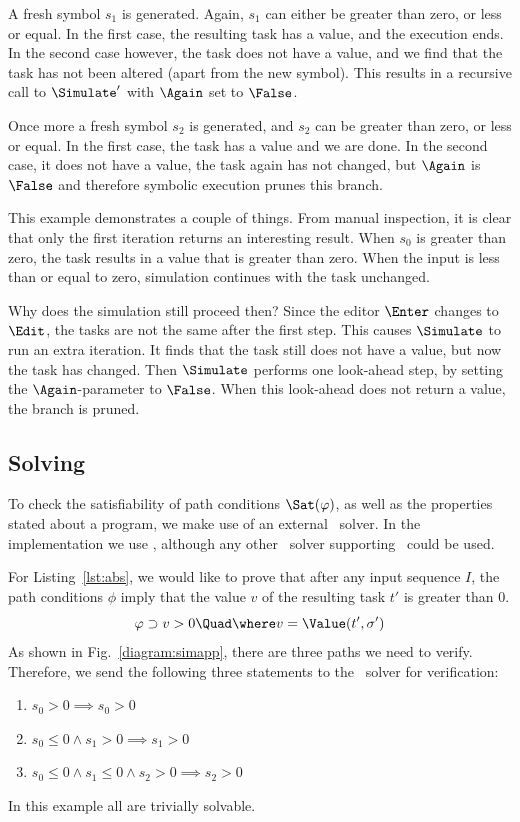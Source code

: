 A fresh symbol $s_1$ is generated.
Again, $s_1$ can either be greater than zero, or less or equal.
In the first case, the resulting task has a value, and the execution ends.
In the second case however, the task does not have a value, and we find that the task has not been altered (apart from the new symbol).
This results in a recursive call to $\Simulate'$ with $\Again$ set to $\False$.

Once more a fresh symbol $s_2$ is generated, and $s_2$ can be greater than zero, or less or equal.
In the first case, the task has a value and we are done.
In the second case, it does not have a value, the task again has not changed, but $\Again$ is $\False$ and therefore symbolic execution prunes this branch.

This example demonstrates a couple of things.
From manual inspection, it is clear that only the first iteration returns an interesting result.
When $s_0$ is greater than zero, the task results in a value that is greater than zero.
When the input is less than or equal to zero, simulation continues with the task unchanged.

Why does the simulation still proceed then?
Since the editor $\Enter$ changes to $\Edit$, the tasks are not the same after the first step.
This causes $\Simulate$ to run an extra iteration.
It finds that the task still does not have a value, but now the task has changed.
Then $\Simulate$ performs one look-ahead step, by setting the $\Again$-parameter to $\False$.
When this look-ahead does not return a value, the branch is pruned.



\subsection{Solving}

To check the satisfiability of path conditions $\Sat(\phi)$, as well as the properties stated about a program,
we make use of an external \SMT~solver.
In the implementation we use \ZTHREE, although any other \SMT~solver supporting \SMTLIB\ could be used.

For Listing~\ref{lst:abs}, we would like to prove that after any input sequence $I$,
the path conditions $\phi$ imply that the value $v$ of the resulting task $t'$ is greater than $0$.
\begin{equation*}
  \phi \implies v  > 0 \Quad \where v = \Value(t',\sigma')
\end{equation*}
As shown in Fig.~\ref{diagram:simapp}, there are three paths we need to verify.
Therefore, we send the following three statements to the \SMT~solver for verification:
\begin{enumerate}
  \item $s_0 > 0                                   \implies s_0 > 0  $
  \item $s_0 \leq 0 \land s_1 > 0                  \implies s_1 > 0  $
  \item $s_0 \leq 0 \land s_1 \leq 0 \land s_2 > 0 \implies s_2 > 0  $
\end{enumerate}
In this example all are trivially solvable.



